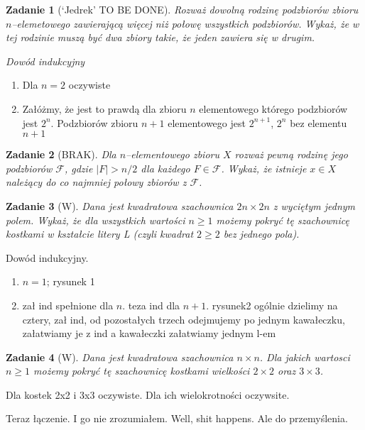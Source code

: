 \documentclass{mwbk}
\newtheorem{zad}{Zadanie}[chapter]
\begin{document}
\begin{zad}[`Jedrek' TO BE DONE]
    Rozważ dowolną rodzinę podzbiorów zbioru $n$--elemetowego zawierającą
    więcej niż połowę wszystkich podzbiorów. Wykaż, że w tej rodzinie muszą być dwa zbiory
    takie, że jeden zawiera się w drugim.
\end{zad}
\begin{mdframed}
    \textit{Dowód indukcyjny}

    \begin{enumerate}
        \item Dla $n=2$ oczywiste
        \item Załóżmy, że jest to prawdą dla zbioru $n$ elementowego
              którego podzbiorów jest $2^n$. Podzbiorów zbioru $n+1$ elementowego
              jest $2^{n+1}$, $2^n$ bez elementu $n+1$
    \end{enumerate}
\end{mdframed}



\begin{zad}[BRAK]
    Dla $n$--elementowego zbioru $X$ rozważ pewną rodzinę jego podzbiorów
    $\mathcal{F}$, gdzie $|F| > n/2$ dla każdego $F \in \mathcal{F}$. Wykaż, że istnieje
    $x \in X$ należący do co najmniej połowy zbiorów z $\mathcal{F}$.
\end{zad}
\begin{mdframed}

\end{mdframed}


\begin{zad}[W]
    Dana jest kwadratowa szachownica $2n \times 2n$ z wyciętym jednym polem.
    Wykaż, że dla wszystkich wartości $n \geq 1$ możemy pokryć tę szachownicę kostkami w
    kształcie litery L (czyli kwadrat $2 \geq 2$ bez jednego pola).
\end{zad}
\begin{mdframed}
    Dowód indukcyjny.
    \begin{enumerate}
        \item $n = 1$; rysunek 1
        \item zał ind spełnione dla $n$. teza ind dla $n+1$. rysunek2 ogólnie dzielimy na
              cztery, zał ind, od pozostałych trzech odejmujemy po jednym kawałeczku, załatwiamy
              je z ind a kawałeczki załatwiamy jednym l-em
    \end{enumerate}
\end{mdframed}

\begin{zad}[W]
    Dana jest kwadratowa szachownica $n \times n$. Dla jakich wartosci $n\geq 1$
    możemy pokryć tę szachownicę kostkami wielkości $2 \times 2$ oraz $3 \times 3$.
\end{zad}
\begin{mdframed}
    Dla kostek 2x2 i 3x3 oczywiste. Dla ich wielokrotności oczywsite.

    Teraz łączenie. I go nie zrozumiałem. Well, shit happens.
    Ale do przemyślenia.
\end{mdframed}
\end{document}
